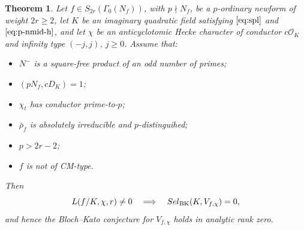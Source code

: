 \documentclass[10pt,letterpaper]{amsart}
\theoremstyle{plain}
\newtheorem{thm}{Theorem}[subsection] %
\theoremstyle{definition}
\theoremstyle{definition}
\theoremstyle{plain}
\theoremstyle{plain}
\theoremstyle{plain}
\theoremstyle{remark}
\numberwithin{equation}{section}
\newcommand{\Sel}{Sel}
\def\cO{\mathcal O}
\def\Sel{{\rm Sel}}
\begin{document}
 
\begin{thm}\label{thm:BK-def}
Let $f\in S_{2r}(\Gamma_0(N_f))$, with $p\nmid N_f$, be a $p$-ordinary newform of weight $2r\geq 2$, let $K$ be an imaginary quadratic field satisfying $\eqref{eq:spl}$ and $\eqref{eq:p-nmid-h}$, and let $\chi$ be an anticyclotomic Hecke character of conductor $c\cO_K$ and infinity type $(-j,j)$, $j\geq 0$. 
Assume that:
\begin{itemize}
    \item $N^-$ is a square-free product of an odd number of primes;
    \item $(pN_f,cD_K)=1$;
    \item $\chi_t$ has conductor prime-to-$p$;
    \item $\bar{\rho}_f$ is absolutely irreducible and $p$-distinguihed;
    \item $p>2r-2$;
    \item $f$ is not of CM-type.
\end{itemize}
Then
\[
L(f/K,\chi,r)\neq 0\quad\Longrightarrow\quad\Sel_{\mathrm{BK}}(K,V_{f,\chi})=0,
\] 
and hence the Bloch--Kato conjecture for $V_{f,\chi}$ holds in analytic rank zero.
\end{thm}
\end{document}
